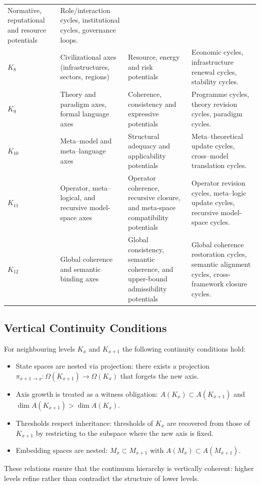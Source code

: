 \begin{octablescope}
\begin{longtable}{@{}L{0.08\textwidth}L{0.18\textwidth}L{0.22\textwidth}L{0.42\textwidth}@{}}
      Normative, reputational and resource potentials &
      Role/interaction cycles, institutional cycles, governance loops. \\[0.3em]
    \(K_8\) &
      Civilizational axes (infrastructures, sectors, regions) &
      Resource, energy and risk potentials &
      Economic cycles, infrastructure renewal cycles, stability cycles. \\[0.3em]
    \(K_9\) &
      Theory and paradigm axes, formal language axes &
      Coherence, consistency and expressive potentials &
      Programme cycles, theory revision cycles, paradigm cycles. \\[0.3em]
    \(K_{10}\) &
      Meta--model and meta--language axes &
      Structural adequacy and applicability potentials &
      Meta--theoretical update cycles, cross--model translation cycles. \\[0.3em]
    \(K_{11}\) &
      Operator, meta--logical, and recursive model-space axes &
      Operator coherence, recursive closure, and meta-space compatibility potentials &
      Operator revision cycles, meta--logic update cycles, recursive model-space cycles. \\[0.3em]
    \(K_{12}\) &
      Global coherence and semantic binding axes &
      Global consistency, semantic coherence, and upper-bound admissibility potentials &
      Global coherence restoration cycles, semantic alignment cycles, cross-framework closure cycles. \\
    \bottomrule
\end{longtable}
\end{octablescope}

\subsection{Vertical Continuity Conditions}

For neighbouring levels \(K_x\) and \(K_{x+1}\) the following continuity
conditions hold:

\begin{itemize}
  \item State spaces are nested via projection:
        there exists a projection
        \(\pi_{x+1\to x} : \Omega(K_{x+1}) \to \Omega(K_x)\)
        that forgets the new axis.
  \item Axis growth is treated as a witness obligation:
        \(A(K_x)\subset A(K_{x+1})\) and
        \(\dim A(K_{x+1}) > \dim A(K_x)\).
  \item Thresholds respect inheritance:
        thresholds of \(K_x\) are recovered from those of \(K_{x+1}\) by
        restricting to the subspace where the new axis is fixed.
  \item Embedding spaces are nested:
        \(M_x\subset M_{x+1}\) with
        \(A(M_x)\subset A(M_{x+1})\).
\end{itemize}

These relations ensure that the continuum hierarchy is vertically coherent:
higher levels refine rather than contradict the structure of lower levels.



\endgroup
